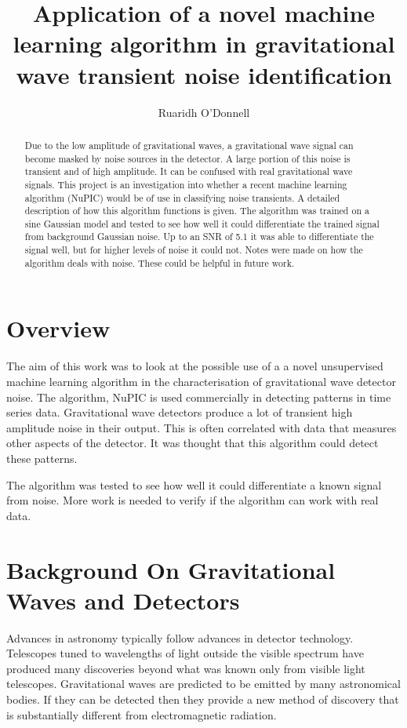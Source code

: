 \documentclass[a4paper]{jpconf}
\begin{document}
\title{Application of a novel machine learning algorithm in gravitational wave transient noise identification}
\author{Ruaridh O'Donnell}
\begin{abstract}
    Due to the low amplitude of gravitational waves, a gravitational wave signal can become masked by noise sources in the detector. A large portion of this noise is transient and of high amplitude. It can be confused with real gravitational wave signals. This project is an investigation into whether a recent machine learning algorithm (NuPIC) would be of use in classifying noise transients. A detailed description of how this algorithm functions is given. The algorithm was trained on a sine Gaussian model and tested to see how well it could differentiate the trained signal from background Gaussian noise. Up to an SNR of 5.1 it was able to differentiate the signal well, but for higher levels of noise it could not. Notes were made on how the algorithm deals with noise. These could be helpful in future work.
\end{abstract}

\section{Overview}
	The aim of this work was to look at the possible use of a a novel unsupervised machine learning algorithm in the characterisation of gravitational wave detector noise. The algorithm, NuPIC is used commercially in detecting patterns in time series data. Gravitational wave detectors produce a lot of transient high amplitude noise in their output. This is often correlated with data that measures other aspects of the detector. It was thought that this algorithm could detect these patterns.
	
	The algorithm was tested to see how well it could differentiate a known signal from noise. More work is needed to verify if the algorithm can work with real data.
    
\section{Background On Gravitational Waves and Detectors}
Advances in astronomy typically follow advances in detector technology. Telescopes tuned to wavelengths of light outside the visible spectrum have produced many discoveries beyond what was known only from visible light telescopes. Gravitational waves are predicted to be emitted by many astronomical bodies. If they can be detected then they provide a new method of discovery that is substantially different from electromagnetic radiation.
\end{document}
